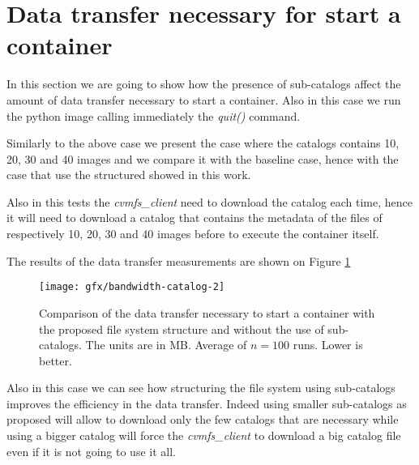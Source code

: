 \section{Data transfer necessary for start a container}

In this section we are going to show how the presence of sub-catalogs affect
the amount of data transfer necessary to start a container. Also in this case we run
the python image calling immediately the \textit{quit()} command.

Similarly to the above case we present the case where the catalogs contains 10,
20, 30 and 40 images and we compare it with the baseline case, hence with the
case that use the structured showed in this work. 

Also in this tests the \textit{cvmfs\_client} need to download the catalog each
time, hence it will need to download a catalog that contains the metadata of
the files of respectively 10, 20, 30 and 40 images before to execute the
container itself.

The results of the data transfer measurements are shown on Figure \ref{fig:bandwidth-usage}

\begin{figure}[!h]{}
    \texttt{[image: gfx/bandwidth-catalog-2]}
        \caption{Comparison of the data transfer necessary to start a container with the proposed file system structure and without the use of sub-catalogs. The units are in MB. Average of $n=100$ runs. Lower is better.}
        \label{fig:bandwidth-usage}
\end{figure}


%

Also in this case we can see how structuring the file system using sub-catalogs
improves the efficiency in the data transfer. Indeed using smaller sub-catalogs
as proposed will allow to download only the few catalogs that are necessary
while using a bigger catalog will force the \textit{cvmfs\_client} to download
a big catalog file even if it is not going to use it all. 

